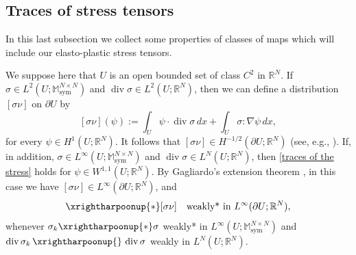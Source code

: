\documentclass[reqno,10pt]{amsart}
\numberwithin{equation}{section}
\theoremstyle{remark}
\newcommand{\M}{\mathbb{M}}
\newcommand{\R}{\mathbb{R}}
\newcommand{\U}{U}
\DeclareMathOperator{\sym}{sym}
\newcommand{\weak}{\,\xrightharpoonup{}\,}
\newcommand{\weakstar}{\xrightharpoonup{*}}
\renewcommand{\div}{\operatorname{div}}
\newcommand{\genprod}{\stackrel{\text{gen.}}{\otimes}}
\begin{document}

\subsection{Traces of stress tensors} \label{sub:traces}

In this last subsection we collect some properties of classes of maps which will include our elasto-plastic stress tensors.

We suppose here that $\U$ is an open bounded set of class $C^2$ in $\R^N$.
If $\sigma \in L^2(\U;\M^{N \times N}_{\sym})$ and $\div\sigma \in L^2(\U;\R^N)$, then we can define a distribution $[ \sigma \nu ]$ on $\partial{\U}$ by
\begin{equation} \label{traces of the stress}
	[ \sigma \nu ](\psi) := \int_{\U} \psi \cdot \div\sigma \,dx + \int_{\U} \sigma : \nabla \psi \,dx,
\end{equation}
for every $\psi \in H^1(\U;\R^N)$.
It follows that $[ \sigma \nu ] \in H^{-1/2}(\partial{\U};\R^N)$ (see, e.g., \cite[Chapter 1, Theorem 1.2]{temam2001navier}).
If, in addition, $\sigma \in L^{\infty}(\U;\M^{N \times N}_{\sym})$ and $\div\sigma \in L^N(\U;\R^N)$, then \eqref{traces of the stress} holds for $\psi \in W^{1,1}(\U;\R^N)$.
By Gagliardo's extension theorem \cite[Theorem 1.II]{Gagliardo.1957}, in this case we have $[ \sigma \nu ] \in L^{\infty}(\partial{\U};\R^N)$, and 
\begin{equation*}
	[ \sigma_k \nu ] \weakstar [ \sigma \nu ] \quad \text{weakly* in $L^{\infty}(\partial{\U};\R^N)$},
\end{equation*}
whenever $\sigma_k \weakstar \sigma$ weakly* in $L^{\infty}(\U;\M^{N \times N}_{\sym})$ and $\div\sigma_k \weak \div\sigma$ weakly in $L^N(\U;\R^N)$.
\end{document}
